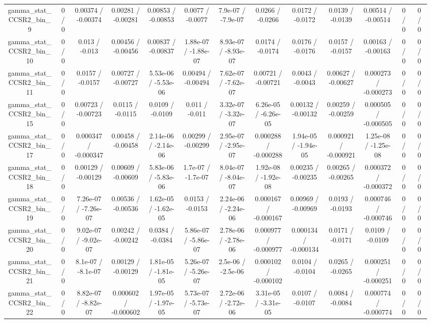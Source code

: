 \documentclass[10pt]{article}
\begin{document}
\begin{table}[htbp]
\begin{center}
\begin{tabular}{|c|c|c|c|c|c|c|c|c|c|c|c|c|}
  gamma_stat_CCSR2_bin_9 & 0 / 0 & 0.00374 / -0.00374 & 0.00281 / -0.00281 & 0.00853 / -0.00853 & 0.0077 / -0.0077 & 7.9e-07 / -7.9e-07 & 0.0266 / -0.0266 & 0.0172 / -0.0172 & 0.0139 / -0.0139 & 0.00514 / -0.00514 & 0 / 0 & 0 / 0 \\ 
  gamma_stat_CCSR2_bin_10 & 0 / 0 & 0.013 / -0.013 & 0.00456 / -0.00456 & 0.00837 / -0.00837 & 1.88e-07 / -1.88e-07 & 8.93e-07 / -8.93e-07 & 0.0174 / -0.0174 & 0.0176 / -0.0176 & 0.0157 / -0.0157 & 0.00163 / -0.00163 & 0 / 0 & 0 / 0 \\ 
  gamma_stat_CCSR2_bin_11 & 0 / 0 & 0.0157 / -0.0157 & 0.00727 / -0.00727 & 5.53e-06 / -5.53e-06 & 0.00494 / -0.00494 & 7.62e-07 / -7.62e-07 & 0.00721 / -0.00721 & 0.0043 / -0.0043 & 0.00627 / -0.00627 & 0.000273 / -0.000273 & 0 / 0 & 0 / 0 \\ 
  gamma_stat_CCSR2_bin_15 & 0 / 0 & 0.00723 / -0.00723 & 0.0115 / -0.0115 & 0.0109 / -0.0109 & 0.011 / -0.011 & 3.32e-07 / -3.32e-07 & 6.26e-05 / -6.26e-05 & 0.00132 / -0.00132 & 0.00259 / -0.00259 & 0.000505 / -0.000505 & 0 / 0 & 0 / 0 \\ 
  gamma_stat_CCSR2_bin_17 & 0 / 0 & 0.000347 / -0.000347 & 0.00458 / -0.00458 & 2.14e-06 / -2.14e-06 & 0.00299 / -0.00299 & 2.95e-07 / -2.95e-07 & 0.000288 / -0.000288 & 1.94e-05 / -1.94e-05 & 0.000921 / -0.000921 & 1.25e-08 / -1.25e-08 & 0 / 0 & 0 / 0 \\ 
  gamma_stat_CCSR2_bin_18 & 0 / 0 & 0.00129 / -0.00129 & 0.00609 / -0.00609 & 5.83e-06 / -5.83e-06 & 1.7e-07 / -1.7e-07 & 8.04e-07 / -8.04e-07 & 1.92e-08 / -1.92e-08 & 0.00235 / -0.00235 & 0.00265 / -0.00265 & 0.000372 / -0.000372 & 0 / 0 & 0 / 0 \\ 
  gamma_stat_CCSR2_bin_19 & 0 / 0 & 7.26e-07 / -7.26e-07 & 0.00536 / -0.00536 & 1.62e-05 / -1.62e-05 & 0.0153 / -0.0153 & 2.24e-06 / -2.24e-06 & 0.000167 / -0.000167 & 0.00969 / -0.00969 & 0.0193 / -0.0193 & 0.000746 / -0.000746 & 0 / 0 & 0 / 0 \\ 
  gamma_stat_CCSR2_bin_20 & 0 / 0 & 9.02e-07 / -9.02e-07 & 0.00242 / -0.00242 & 0.0384 / -0.0384 & 5.86e-07 / -5.86e-07 & 2.78e-06 / -2.78e-06 & 0.000977 / -0.000977 & 0.000134 / -0.000134 & 0.0171 / -0.0171 & 0.0109 / -0.0109 & 0 / 0 & 0 / 0 \\ 
  gamma_stat_CCSR2_bin_21 & 0 / 0 & 8.1e-07 / -8.1e-07 & 0.00129 / -0.00129 & 1.81e-05 / -1.81e-05 & 5.26e-07 / -5.26e-07 & 2.5e-06 / -2.5e-06 & 0.000102 / -0.000102 & 0.0104 / -0.0104 & 0.0265 / -0.0265 & 0.000251 / -0.000251 & 0 / 0 & 0 / 0 \\ 
  gamma_stat_CCSR2_bin_22 & 0 / 0 & 8.82e-07 / -8.82e-07 & 0.000602 / -0.000602 & 1.97e-05 / -1.97e-05 & 5.73e-07 / -5.73e-07 & 2.72e-06 / -2.72e-06 & 3.31e-05 / -3.31e-05 & 0.0107 / -0.0107 & 0.0084 / -0.0084 & 0.000774 / -0.000774 & 0 / 0 & 0 / 0 \\ 

\end{tabular}
\end{center}
\end{table}
\end{document}
